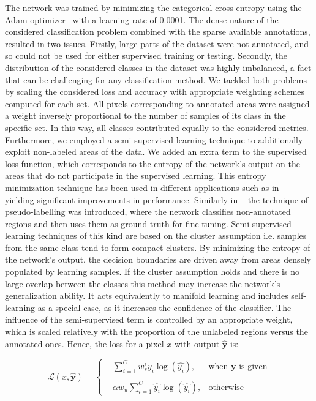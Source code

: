\documentclass[journal]{IEEEtran}
\begin{document}
The network was trained by minimizing the categorical cross entropy using the Adam optimizer~\cite{Adam} with a learning rate of 0.0001. The dense nature of the considered classification problem combined with the sparse available annotations, resulted in two issues. Firstly, large parts of the dataset were not annotated, and so could not be used for either supervised training or testing. Secondly, the distribution of the considered classes in the dataset was highly imbalanced, a fact that can be challenging for any classification method. We tackled both problems by scaling the considered loss and accuracy with appropriate weighting schemes computed for each set. All pixels corresponding to annotated areas were assigned a weight inversely proportional to the number of samples of its class in the specific set. In this way, all classes contributed equally to the considered metrics. Furthermore, we employed a semi-supervised learning technique to additionally exploit non-labeled areas of the data. We added an extra term to the supervised loss function, which corresponds to the entropy of the network's output on the areas that do not participate in the supervised learning. This entropy minimization technique has been used in different applications such as in ~\cite{entr_min_semi_sup} yielding significant improvements in performance. Similarly in ~\cite{lee2013pseudo} the technique of pseudo-labelling was introduced, where the network classifies non-annotated regions and then uses them as ground truth for fine-tuning. Semi-supervised learning techniques of this kind are based on the cluster assumption i.e. samples from the same class tend to form compact clusters. By minimizing the entropy of the network's output, the decision boundaries are driven away from areas densely populated by learning samples. If the cluster assumption holds and there is no large overlap between the classes this method may increase the network's generalization ability. It acts equivalently to manifold learning and includes self-learning as a special case, as it increases the confidence of the classifier. The influence of the semi-supervised term is controlled by an appropriate weight, which is scaled relatively with the proportion of the unlabeled regions versus the annotated ones. Hence, the loss for a pixel $x$ with output $\mathbf{\hat{y}}$ is:

\begin{equation}
\mathcal{L}(x, \mathbf{\hat{y}}) = 
\left \{ 
\begin{matrix}
-\sum_{i=1}^{C}w_s^{i} y_i\log(\hat{y_i}), & \text{when }\mathbf{y}\text{ is given} \\\\
-\alpha w_u\sum_{i=1}^{C}\hat{y_i}\log(\hat{y_i}), & \text{otherwise}
\end{matrix}
\right.
\end{equation}
\end{document}
